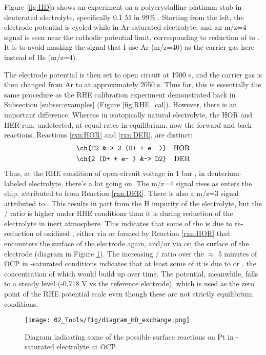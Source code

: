 Figure \ref{fig:HD}a shows an experiment on a polycrystalline platinum stub in deuterated electrolyte, specifically 0.1 M  in 99\% . Starting from the left, the electrode potential is cycled while in Ar-saturated electrolyte, and an m/z=4 signal is seen near the cathodic potential limit, corresponding to reduction of  to . It is to avoid masking the  signal that I use Ar (m/z=40) as the carrier gas here instead of He (m/z=4). 

The electrode potential is then set to open circuit at 1900 s, and the carrier gas is then changed from Ar to  at approximately 2050 s. Thus far, this is essentially the same procedure as the RHE calibration experiment demonstrated back in Subsection \ref{subsec:examples} (Figure \ref{fig:RHE_cal}). However, there is an important difference. Whereas in isotopically natural electrolyte, the HOR and HER run, undetected, at equal rates in equilibrium, now the forward and back reactions, Reactions \ref{rxn:HOR} and \ref{rxn:DER}, are distinct:
\begin{align}
\ch{H2 &-> 2 (H+ + e- )}&&\text{HOR}\label{rxn:HOR}\\
\ch{2 (D+ + e- ) &-> D2}&&\text{DER}\label{rxn:DER}
\end{align}
Thus, at the RHE condition of open-circuit voltage in 1 bar , in deuterium-labeled electrolyte, there's a lot going on. The m/z=4 signal rises as  enters the chip, attributed to  from Reaction \ref{rxn:DER}. There is also a m/z=3 signal attributed to . This  results in part from the H impurity of the electrolyte, but the / ratio is higher under RHE conditions than it is during reduction of the electrolyte in inert atmosphere. This indicates that some of the  is due to re-reduction of oxidized , either via  or  formed by Reaction \ref{rxn:HOR} that encounters the surface of the electrode again, and/or via  on the surface of the electrode (diagram in Figure \ref{fig:HD_diagram}). The increasing / ratio over the $\approx$ 5 minutes of OCP in -saturated conditions indicates that at least some of it is due to  or , the concentration of which would build up over time. The potential, meanwhile, falls to a steady level (-0.718 V vs the reference electrode), which is used as the zero point of the RHE potential scale even though these are not strictly equilibrium conditions.
\begin{figure}[b]
	\centering
	\texttt{[image: 02\_Tools/fig/diagram\_HD\_exchange.png]}
	\caption{Diagram indicating some of the possible surface reactions on Pt in -saturated  electrolyte at OCP.}
	\label{fig:HD_diagram}
\end{figure}

